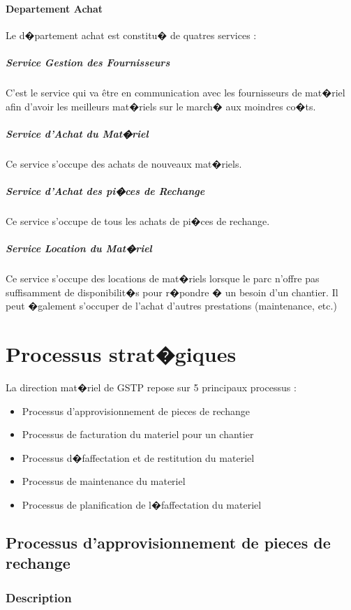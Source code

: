 \documentclass{article}
\begin{document}
            \paragraph{Departement Achat}
                Le d�partement achat est constitu� de quatres services :

                \subparagraph{Service Gestion des Fournisseurs}
	                C'est le service qui va être en communication avec les fournisseurs de mat�riel afin d'avoir les meilleurs mat�riels sur le march� aux moindres co�ts.
                \subparagraph{Service d'Achat du Mat�riel}
	                Ce service s'occupe des achats de nouveaux mat�riels.
                \subparagraph{Service d'Achat des pi�ces de Rechange}
	                Ce service s'occupe de tous les achats de pi�ces de rechange.
                \subparagraph{Service Location du Mat�riel}
	                Ce service s'occupe des locations de mat�riels lorsque le parc n'offre pas suffisamment de disponibilit�s pour r�pondre � un besoin d'un chantier. Il peut �galement s'occuper de l'achat d'autres prestations (maintenance, etc.)


\section{Processus strat�giques}
		La direction mat�riel de GSTP repose sur 5 principaux processus :
		\begin{itemize}
				\item Processus d'approvisionnement de pieces de rechange
				\item Processus de facturation du materiel pour un chantier
				\item Processus d�faffectation et de restitution du materiel
				\item Processus de maintenance du materiel
				\item Processus de planification de l�faffectation du materiel
    \end{itemize}


		\subsection{Processus d'approvisionnement de pieces de rechange}
				\subsubsection{Description}
				
\end{document}
